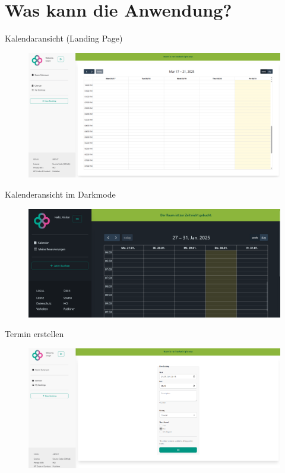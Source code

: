 \section{Was kann die Anwendung?}
\begin{frame}{Kalendaransicht (Landing Page)}
    \thispagestyle{plain}
    \begin{figure}
        \centering
        \includegraphics[width=1\linewidth]{pictures/calendar.png}
        \label{fig:enter-label}
    \end{figure}
    
\end{frame}

\begin{frame}{Kalenderansicht im Darkmode}
    \thispagestyle{plain}
    \begin{figure}
        \centering
        \includegraphics[width=1\linewidth]{pictures/calendar_dark.png}
        \label{fig:enter-label}
    \end{figure}
\end{frame}

\begin{frame}{Termin erstellen}
    \thispagestyle{plain}
    \begin{figure}
        \centering
        \includegraphics[width=1\linewidth]{pictures/bookings_create.png}
        \label{fig:enter-label}
    \end{figure}
\end{frame}


